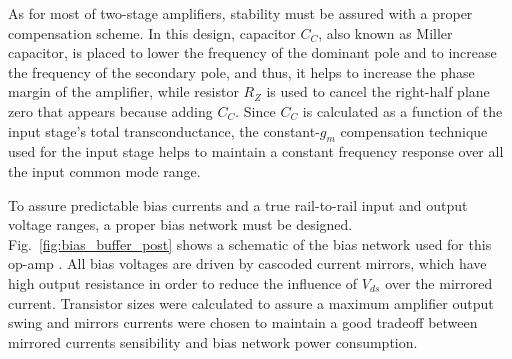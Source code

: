 As for most of two-stage amplifiers, stability must be assured with a proper compensation scheme. In this design, capacitor $C_C$, also known as Miller capacitor, is placed to lower the frequency of the dominant pole and to increase the frequency of the secondary pole, and thus, it helps to increase the phase margin of the amplifier, while resistor $R_Z$ is used to cancel the right-half plane zero that appears because adding $C_C$. Since $C_C$ is calculated as a function of the input stage's total transconductance, the constant-$g_m$ compensation technique used for the input stage helps to maintain a constant frequency response over all the input common mode range.

To assure predictable bias currents and a true rail-to-rail input and output voltage ranges, a proper bias network must be designed. Fig.~\ref{fig:bias_buffer_post} shows a schematic of the bias network used for this op-amp \citep{baker101}. All bias voltages are driven by cascoded current mirrors, which have high output resistance in order to reduce the influence of $V_{ds}$ over the mirrored current. Transistor sizes were calculated to assure  a maximum amplifier output swing and mirrors currents were chosen to maintain a good tradeoff between mirrored currents sensibility and bias network power consumption. 

